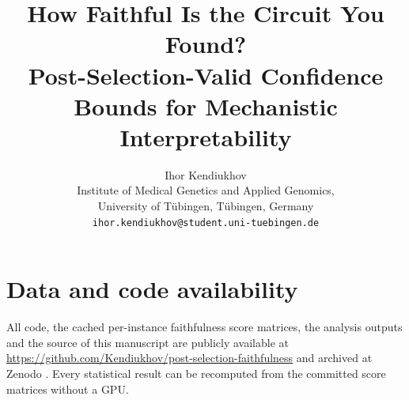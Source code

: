 \documentclass[11pt]{article}
\title{\bf How Faithful Is the Circuit You Found?\\[2pt]
Post-Selection-Valid Confidence Bounds for Mechanistic Interpretability}
\author{Ihor Kendiukhov\\[2pt]
\normalsize Institute of Medical Genetics and Applied Genomics,\\
\normalsize University of T\"ubingen, T\"ubingen, Germany\\
\normalsize \texttt{ihor.kendiukhov@student.uni-tuebingen.de}}
\date{}
\newcommand{\paperdir}{}
\begin{document}
\maketitle

\begin{abstract}

\end{abstract}



\section*{Data and code availability}
All code, the cached per-instance faithfulness score matrices, the analysis
outputs and the source of this manuscript are publicly available at
\url{https://github.com/Kendiukhov/post-selection-faithfulness} and archived at
Zenodo \citep[][DOI: 10.5281/zenodo.21891261]{kendiukhov2026zenodo}. Every statistical result can be
recomputed from the committed score matrices without a GPU.




\appendix

\end{document}
